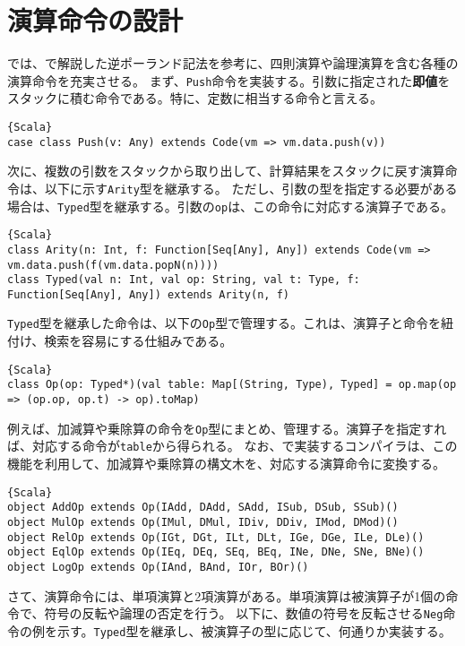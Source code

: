 \documentclass[10pt,a4paper]{book}
\begin{document}
\section{演算命令の設計\label{sect:op}}

では、で解説した逆ポーランド記法を参考に、四則演算や論理演算を含む各種の演算命令を充実させる。
まず、\texttt{Push}命令を実装する。引数に指定された\textbf{即値}をスタックに積む命令である。特に、定数に相当する命令と言える。

\begin{Verbatim}{Scala}
case class Push(v: Any) extends Code(vm => vm.data.push(v))
\end{Verbatim}

次に、複数の引数をスタックから取り出して、計算結果をスタックに戻す演算命令は、以下に示す\texttt{Arity}型を継承する。
ただし、引数の型を指定する必要がある場合は、\texttt{Typed}型を継承する。引数の\texttt{op}は、この命令に対応する演算子である。

\begin{Verbatim}{Scala}
class Arity(n: Int, f: Function[Seq[Any], Any]) extends Code(vm => vm.data.push(f(vm.data.popN(n))))
class Typed(val n: Int, val op: String, val t: Type, f: Function[Seq[Any], Any]) extends Arity(n, f)
\end{Verbatim}

\texttt{Typed}型を継承した命令は、以下の\texttt{Op}型で管理する。これは、演算子と命令を紐付け、検索を容易にする仕組みである。

\begin{Verbatim}{Scala}
class Op(op: Typed*)(val table: Map[(String, Type), Typed] = op.map(op => (op.op, op.t) -> op).toMap)
\end{Verbatim}

例えば、加減算や乗除算の命令を\texttt{Op}型にまとめ、管理する。演算子を指定すれば、対応する命令が\texttt{table}から得られる。
なお、で実装するコンパイラは、この機能を利用して、加減算や乗除算の構文木を、対応する演算命令に変換する。

\begin{Verbatim}{Scala}
object AddOp extends Op(IAdd, DAdd, SAdd, ISub, DSub, SSub)()
object MulOp extends Op(IMul, DMul, IDiv, DDiv, IMod, DMod)()
object RelOp extends Op(IGt, DGt, ILt, DLt, IGe, DGe, ILe, DLe)()
object EqlOp extends Op(IEq, DEq, SEq, BEq, INe, DNe, SNe, BNe)()
object LogOp extends Op(IAnd, BAnd, IOr, BOr)()
\end{Verbatim}

さて、演算命令には、単項演算と2項演算がある。単項演算は被演算子が1個の命令で、符号の反転や論理の否定を行う。
以下に、数値の符号を反転させる\texttt{Neg}命令の例を示す。\texttt{Typed}型を継承し、被演算子の型に応じて、何通りか実装する。
\end{document}
